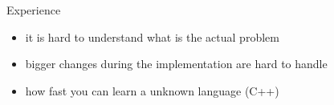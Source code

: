 
\begin{frame}{Experience}
	\begin{itemize}
		\item it is hard to understand what is the actual problem
		\item bigger changes during the implementation are hard to handle
		\item how fast you can learn a unknown language (C++)
	\end{itemize}
\end{frame}